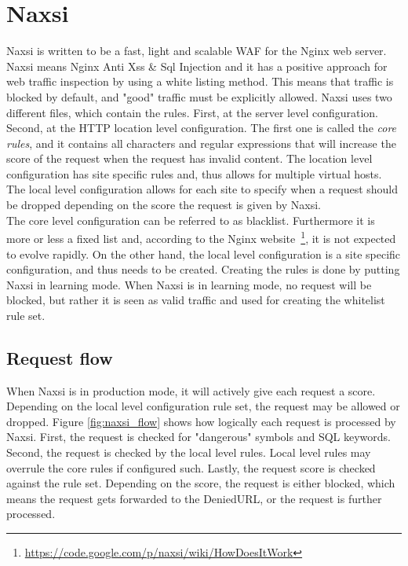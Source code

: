 \documentclass[Naxsi]{subfiles}
\begin{document}
\section{Naxsi}
\label{sec:Naxsi}
Naxsi is written to be a fast, light and scalable \ac{WAF} for the Nginx web server. Naxsi means Nginx Anti Xss \& Sql Injection and it has a positive approach for web traffic inspection by using a white listing method. This means that traffic is blocked by default, and "good" traffic must be explicitly allowed. Naxsi uses two different files, which contain the rules. First, at the server level configuration. Second, at the HTTP location level configuration. The first one is called the \emph{core rules}, and it contains all characters and regular expressions that will increase the score of the request when the request has invalid content. The location level configuration has site specific rules and, thus allows for multiple virtual hosts. The local level configuration allows for each site to specify when a request should be dropped depending on the score the request is given by Naxsi.\\
The core level configuration can be referred to as blacklist. Furthermore it is more or less a fixed list and, according to the Nginx website~\footnote{\url{https://code.google.com/p/naxsi/wiki/HowDoesItWork}}, it is not expected to evolve rapidly. On the other hand, the local level configuration is a site specific configuration, and thus needs to be created. Creating the rules is done by putting Naxsi in learning mode. When Naxsi is in learning mode, no request will be blocked, but rather it is seen as valid traffic and used for creating the whitelist rule set.

\subsection{Request flow}
When Naxsi is in production mode, it will actively give each request a score. Depending on the local level configuration rule set, the request may be allowed or dropped. Figure \ref{fig:naxsi_flow} shows how logically each request is processed by Naxsi. First, the request is checked for "dangerous" symbols and SQL keywords. Second, the request is checked by the local level rules. Local level rules may overrule the core rules if configured such. Lastly, the request score is checked against the rule set. Depending on the score, the request is either blocked, which means the request gets forwarded to the DeniedURL, or the request is further processed.
\end{document}
